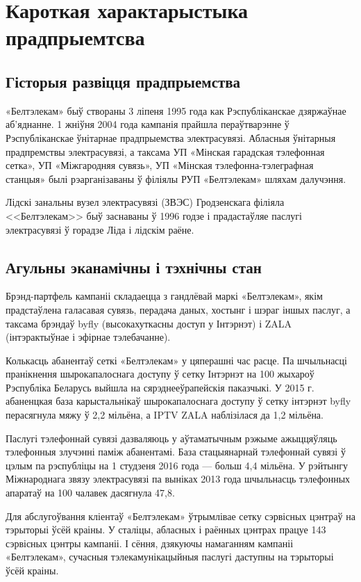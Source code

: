 \section{Кароткая характарыстыка прадпрыемтсва}

\subsection{Гісторыя развіцця прадпрыемства}
«Белтэлекам» быў створаны 3 ліпеня 1995 года как Рэспубліканскае дзяржаўнае аб'яднанне.
1 жніўня 2004 года кампанія прайшла пераўтварэнне ў Рэспубліканскае ўнітарнае прадпрыемства электрасувязі.
Абласныя ўнітарныя прадпремствы электрасувязі, а таксама УП «Мінская гарадская тэлефонная сетка»,
УП «Міжгародняя сувязь», УП «Мінская тэлефонна-тэлеграфная станцыя» былі рэарганізаваны ў філіялы РУП «Белтэлекам» шляхам далучэння.

Лідскі занальны вузел электрасувязі  (ЗВЭС) Гродзенскага філіяла <<Белтэлекам>>
быў заснаваны ў 1996 годзе і прадастаўляе паслугі электрасувязі ў горадзе Ліда і лідскім раёне.

\subsection{Агульны эканамічны і тэхнічны стан}
Брэнд-партфель кампаніі складаецца з гандлёвай маркі «Белтэлекам»,
якім прадстаўлена галасавая сувязь, перадача даных, хостынг і шэраг іншых паслуг,
а таксама брэндаў byfly (высокахуткасны доступ у Інтэрнэт) і ZALA (інтэрактыўнае і эфірнае тэлебачанне).

Колькасць абанентаў сеткі «Белтэлекам» у цяперашні час расце.
Па шчыльнасці пранікнення шырокапалоснага доступу ў сетку Інтэрнэт на 100 жыхароў
Рэспубліка Беларусь выйшла на сярэднееўрапейскія паказчыкі.
У 2015 г. абаненцкая база карыстальнікаў шырокапалоснага доступу ў сетку інтэрнэт byfly
перасягнула мяжу ў 2,2 мільёна, а IPTV ZALA наблізілася да 1,2 мільёна.

Паслугі тэлефоннай сувязі дазваляюць у аўтаматычным рэжыме
ажыццяўляць тэлефонныя злучэнні паміж абанентамі.
База стацыянарнай тэлефоннай сувязі ў цэлым па рэспубліцы на 1 студзеня 2016 года ---
больш 4,4 мільёна.
У рэйтынгу Міжнароднага звязу электрасувязі па выніках 2013 года
шчыльнасць тэлефонных апаратаў на 100 чалавек дасягнула 47,8.

Для абслугоўвання кліентаў «Белтэлекам» ўтрымлівае сетку сэрвісных цэнтраў
на тэрыторыі ўсёй краіны.
У сталіцы, абласных і раённых цэнтрах працуе 143 сэрвісных цэнтры кампаніі.
І сёння, дзякуючы намаганням кампаніі «Белтэлекам»,
сучасныя тэлекамунікацыйныя паслугі даступны на тэрыторыі ўсёй краіны.

